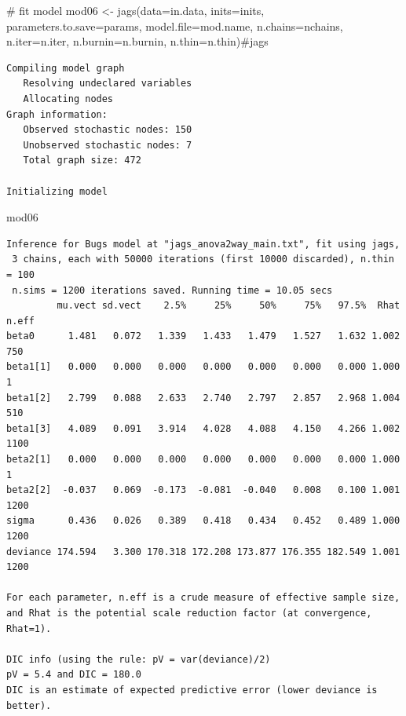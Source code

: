 \documentclass[
  13,
  letterpaper,
]{report}
\newenvironment{Shaded}{\begin{snugshade}}{\end{snugshade}}
\newcommand{\AttributeTok}[1]{\textcolor[rgb]{0.40,0.45,0.13}{#1}}
\newcommand{\CommentTok}[1]{\textcolor[rgb]{0.37,0.37,0.37}{#1}}
\newcommand{\FunctionTok}[1]{\textcolor[rgb]{0.28,0.35,0.67}{#1}}
\newcommand{\NormalTok}[1]{\textcolor[rgb]{0.00,0.23,0.31}{#1}}
\newcommand{\OtherTok}[1]{\textcolor[rgb]{0.00,0.23,0.31}{#1}}
\begin{document}
\begin{Shaded}
\begin{Highlighting}[]
\CommentTok{\# fit model}
\NormalTok{mod06 }\OtherTok{\textless{}{-}} \FunctionTok{jags}\NormalTok{(}\AttributeTok{data=}\NormalTok{in.data, }\AttributeTok{inits=}\NormalTok{inits,}
              \AttributeTok{parameters.to.save=}\NormalTok{params,}
              \AttributeTok{model.file=}\NormalTok{mod.name,}
              \AttributeTok{n.chains=}\NormalTok{nchains, }\AttributeTok{n.iter=}\NormalTok{n.iter,}
              \AttributeTok{n.burnin=}\NormalTok{n.burnin, }\AttributeTok{n.thin=}\NormalTok{n.thin)}\CommentTok{\#jags}
\end{Highlighting}
\end{Shaded}

\begin{verbatim}
Compiling model graph
   Resolving undeclared variables
   Allocating nodes
Graph information:
   Observed stochastic nodes: 150
   Unobserved stochastic nodes: 7
   Total graph size: 472

Initializing model
\end{verbatim}

\begin{Shaded}
\begin{Highlighting}[]
\NormalTok{mod06}
\end{Highlighting}
\end{Shaded}

\begin{verbatim}
Inference for Bugs model at "jags_anova2way_main.txt", fit using jags,
 3 chains, each with 50000 iterations (first 10000 discarded), n.thin = 100
 n.sims = 1200 iterations saved. Running time = 10.05 secs
         mu.vect sd.vect    2.5%     25%     50%     75%   97.5%  Rhat n.eff
beta0      1.481   0.072   1.339   1.433   1.479   1.527   1.632 1.002   750
beta1[1]   0.000   0.000   0.000   0.000   0.000   0.000   0.000 1.000     1
beta1[2]   2.799   0.088   2.633   2.740   2.797   2.857   2.968 1.004   510
beta1[3]   4.089   0.091   3.914   4.028   4.088   4.150   4.266 1.002  1100
beta2[1]   0.000   0.000   0.000   0.000   0.000   0.000   0.000 1.000     1
beta2[2]  -0.037   0.069  -0.173  -0.081  -0.040   0.008   0.100 1.001  1200
sigma      0.436   0.026   0.389   0.418   0.434   0.452   0.489 1.000  1200
deviance 174.594   3.300 170.318 172.208 173.877 176.355 182.549 1.001  1200

For each parameter, n.eff is a crude measure of effective sample size,
and Rhat is the potential scale reduction factor (at convergence, Rhat=1).

DIC info (using the rule: pV = var(deviance)/2)
pV = 5.4 and DIC = 180.0
DIC is an estimate of expected predictive error (lower deviance is better).
\end{verbatim}
\end{document}
